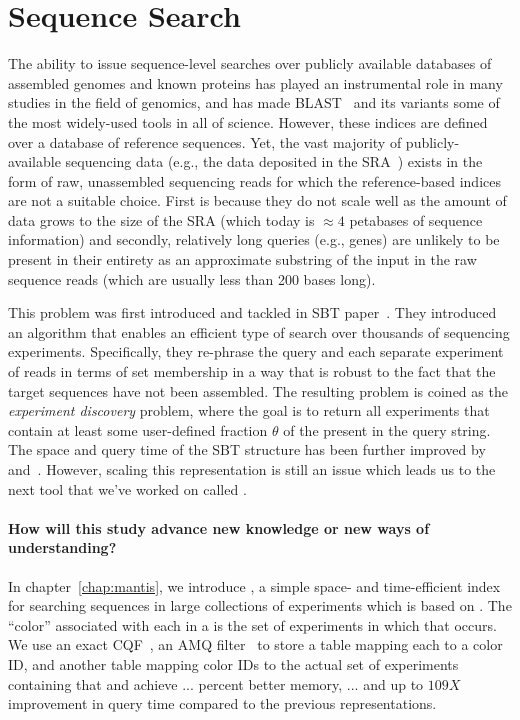 \section{Sequence Search}
\label{subsec:seqsearch}
The ability to issue sequence-level searches over publicly available databases
of assembled genomes and known proteins has played an instrumental role in many
studies in the field of genomics, and has made BLAST~\citep{Altschul1990BLAST}
and its variants some of the most widely-used tools in all of science.
However, these indices are defined over a database of reference sequences.
Yet, the vast majority of
publicly-available sequencing data (e.g., the data deposited in the
SRA~\citep{Kodama2011sequence}) exists in the form of raw, unassembled
sequencing reads for which the reference-based indices are not
a suitable choice. First is because they do not
scale well as the amount of data grows to the size of the  SRA (which today is
$\approx 4$ petabases of sequence information) and secondly, relatively long queries (e.g.,
genes) are unlikely to be present in their entirety as an approximate substring
of the input in the raw sequence reads (which are usually less than 200 bases long).

This problem was first introduced and tackled in SBT paper~\citep{Solomon2016Fast}.
They introduced an algorithm that enables an
efficient type of search over thousands of sequencing experiments.
Specifically, they re-phrase the query and each separate experiment of reads
in terms of \kmer set membership in a way
that is robust to the fact that the target sequences have not been assembled.
The resulting problem is coined as the \emph{experiment discovery} problem,
where the goal is to return all experiments that contain at least some
user-defined fraction $\theta$ of the \kmers present in the query string.
The space and query time of the SBT structure has been further improved
by~\cite{Solomon2017Improved} and~\cite{Sun2017Allsome}.
However, scaling this representation is still an issue
which leads us to the next tool that we've worked on called \mantis.

\paragraph*{How will this study advance new knowledge or new ways of understanding?}
In chapter~\ref{chap:mantis}, we introduce \mantis,
a simple space- and time-efficient index for searching sequences in large
collections of experiments which is based on \cdbgs.
The ``color'' associated with each \kmer
in a \cdbg is the set of experiments in which that \kmer occurs. We
use an exact CQF~\cite{}, an AMQ filter~\cite{} to store a table mapping each \kmer to a color ID,
and another table mapping color IDs to the actual set of experiments
containing that \kmer and achieve ... percent better memory,
... and up to $109X$ improvement in query time compared to the previous representations.


